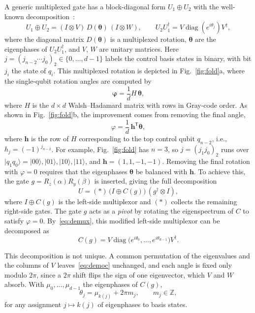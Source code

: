 \documentclass[11pt]{article}
\begin{document}
A generic multiplexed gate has a block-diagonal form $U_1\oplus U_2$ with the well-known decomposition~\cite{smb}:
\begin{equation}\label{eq:demux}
U_1\oplus U_2=(I\otimes V)\,D(\boldsymbol\theta)\,(I\otimes W),\qquad
U_2U_1^\dagger=V\operatorname{diag}(e^{i\theta_j})V^\dagger ,
\end{equation}
where the diagonal matrix $D(\boldsymbol\theta)$ is a multiplexed rotation, $\boldsymbol\theta$ are the eigenphases of $U_2U_1^\dagger$, and $V$, $W$ are unitary matrices. Here $j=(j_{n-2}\cdots j_0)_2\in\{0,\dots,d-1\}$ labels the control basis states in binary, with bit $j_i$ the state of $q_i$. This multiplexed rotation is depicted in Fig.~\ref{fig:fold}a, where the single-qubit rotation angles are computed by~\cite{mottonen}
\begin{equation}\label{eq:walsh}
\boldsymbol\varphi=\frac1d H\,\boldsymbol\theta,
\end{equation}
where $H$ is the $d\times d$ Walsh--Hadamard matrix with rows in Gray-code order. As shown in Fig.~\ref{fig:fold}b, the improvement comes from removing the final angle,
\begin{equation}\label{eq:phi}
\varphi=\frac1d\,\mathbf h^{\mathsf T}\boldsymbol\theta,
\end{equation}
where $\mathbf h$ is the row of $H$ corresponding to the top control qubit $q_{n-2}$, i.e., $h_j=(-1)^{j_{n-2}}$. 
For example, Fig.~\ref{fig:fold} has $n=3$, so $j=(j_1j_0)_2$ runs over $\lvert q_1q_0\rangle=\lvert00\rangle,\lvert01\rangle,\lvert10\rangle,\lvert11\rangle$, and $\mathbf h=(1,1,-1,-1)$. Removing the final rotation with $\varphi=0$ requires that the eigenphases $\boldsymbol\theta$ be balanced with $\mathbf h$. To achieve this, the gate $g=R_z(\alpha)R_y(\beta)$ is inserted, giving the full decomposition
\begin{equation}\label{eq:zxz}
U=(\ast)\,\big(I\oplus C(g)\big)\,(g^\dagger\otimes I),
\end{equation}
where $I\oplus C(g)$ is the left-side multiplexor and $(\ast)$ collects the remaining right-side
gates. The gate $g$ acts as a \emph{pivot} by rotating the eigenspectrum of $C$ to satisfy $\varphi=0$. By~\eqref{eq:demux}, this modified left-side multiplexor can be decomposed as
\begin{equation}\label{eq:democ}
C(g)=V\operatorname{diag}\big(e^{i\theta_0},\dots,e^{i\theta_{d-1}}\big)V^\dagger .
\end{equation}

This decomposition is not unique. A common permutation of the eigenvalues and the columns of $V$
leaves~\eqref{eq:democ} unchanged, and each angle is fixed only modulo $2\pi$, since a $2\pi$ shift
flips the sign of one eigenvector, which $V$ and $W$ absorb. With $\mu_0,\dots,\mu_{d-1}$ the
eigenphases of $C(g)$,
\begin{equation}\label{eq:branch}
\theta_j=\mu_{k(j)}+2\pi m_j,\qquad m_j\in\mathbb Z,
\end{equation}
for any assignment $j\mapsto k(j)$ of eigenphases to basis states.
\end{document}
